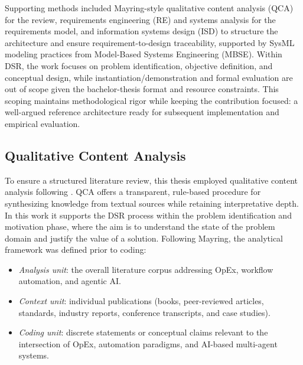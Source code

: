 Supporting methods included Mayring-style qualitative content analysis (QCA) for the review, requirements engineering (RE) and systems analysis for the requirements model, and information systems design (ISD) to structure the architecture and ensure requirement-to-design traceability, supported by SysML modeling practices from Model-Based Systems Engineering (MBSE). Within DSR, the work focuses on problem identification, objective definition, and conceptual design, while instantiation/demonstration and formal evaluation are out of scope given the bachelor-thesis format and resource constraints. This scoping maintains methodological rigor while keeping the contribution focused: a well-argued reference architecture ready for subsequent implementation and empirical evaluation.

\subsection{Qualitative Content Analysis}\label{subsec:qca}
To ensure a structured literature review, this thesis employed qualitative content analysis following \textcite{mayringQualitative2022}. QCA offers a transparent, rule-based procedure for synthesizing knowledge from textual sources while retaining interpretative depth. In this work it supports the DSR process \parencite{peffersDesign2007} within the problem identification and motivation phase, where the aim is to understand the state of the problem domain and justify the value of a solution. Following Mayring, the analytical framework was defined prior to coding:
\begin{itemize}
    \item \textit{Analysis unit}: the overall literature corpus addressing OpEx, workflow automation, and agentic AI.\@
    \item \textit{Context unit}: individual publications (books, peer-reviewed articles, standards, industry reports, conference transcripts, and case studies).
    \item \textit{Coding unit}: discrete statements or conceptual claims relevant to the intersection of OpEx, automation paradigms, and AI-based multi-agent systems.
\end{itemize}


